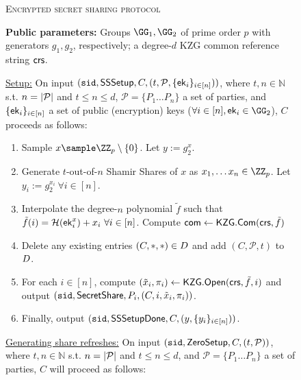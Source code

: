 \begin{figure*}
        \centering
        \begin{mdframed}
    \renewcommand{\labelitemi}{\textendash}
    \begin{center}
        \textsc{Encrypted secret sharing protocol}
    \end{center}
    \textbf{Public parameters:} Groups $\GG_1, \GG_2$ of prime order $p$ with generators $g_1,\allowbreak g_2$, respectively; a degree-$d$ KZG common reference string $\mathsf{crs}$.\hfill
    
    \underline{Setup:}
    On input $(\texttt{sid},\mathsf{SSSetup}, C, (t, \mathcal{P}, \{\mathsf{ek}_i\}_{i \in [n]}))$, where $t,n \in \mathbb{N}$ s.t. $n = \lvert \mathcal{P} \rvert$ and $t \leq n \leq d$, $\mathcal{P} = \{P_1 \ldots P_n\}$ a set of parties, and $\{\mathsf{ek}_i\}_{i \in [n]}$ a set of public (encryption) keys ($\forall i \in [n], \ek_i \in \GG_2$), $C$ proceeds as follows:
        \begin{enumerate}
        \item Sample $x \sample \ZZ_p \setminus \{0\}$. 
        Let $y := g_2^x$.
        \item Generate $t$-out-of-$n$ Shamir Shares of $x$ as $x_1, \ldots x_n \in \ZZ_p$. Let $y_i := g_2^{x_i}~\forall i \in [n]$.
        \item Interpolate the degree-$n$ polynomial $\tilde{f}$ such that $\tilde{f}(i) = \mathcal{H}(\mathsf{ek}_i^x) + x_i~\forall i\in [n]$. Compute $\mathsf{com} \gets \mathsf{KZG}.\mathsf{Com}(\mathsf{crs}, \tilde{f})$ %
        \item Delete any existing entries $(C, *, *) \in D$ and add $(C, \mathcal{P}, t)$ to $D$.
        \item For each $i \in [n]$, compute $(\tilde{x}_i, \pi_i) \gets \mathsf{KZG}.\mathsf{Open}(\mathsf{crs}, \tilde{f}, i)$ and output $(\texttt{sid},\mathsf{SecretShare}, P_i,\allowbreak (C, i, \tilde{x}_i, \pi_i))$.
        \item Finally, output $(\texttt{sid}, \mathsf{SSSetupDone}, C, (y, \{y_i\}_{i \in [n]}))$.
        \end{enumerate}
    \underline{Generating share refreshes:}
    On input $(\texttt{sid},\mathsf{ZeroSetup}, C, (t, \mathcal{P}))$, where $t,\allowbreak n \in \mathbb{N}$ s.t. $n = \lvert \mathcal{P} \rvert$ and $t \leq n \leq d$, and $\mathcal{P} = \{P_1 \ldots P_n\}$ a set of parties, $C$ will proceed as follows:

\end{mdframed}
\end{figure*}
